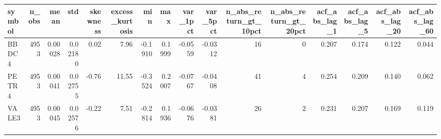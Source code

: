 \begin{tabular}{lrrrrrrrrrrrrrrr}
\toprule
symbol & n_obs & mean & std & skewness & excess_kurtosis & min & max & var_1pct & var_5pct & n_abs_return_gt_10pct & n_abs_return_gt_20pct & acf_abs_lag_1 & acf_abs_lag_5 & acf_abs_lag_20 & acf_abs_lag_60 \\
\midrule
BBDC4 & 4953 & 0.00028 & 0.02180 & 0.02 & 7.96 & -0.1910 & 0.1999 & -0.0559 & -0.0312 & 16 & 0 & 0.207 & 0.174 & 0.122 & 0.044 \\
PETR4 & 4953 & 0.00041 & 0.02755 & -0.76 & 11.55 & -0.3524 & 0.2007 & -0.0767 & -0.0408 & 41 & 4 & 0.254 & 0.209 & 0.140 & 0.062 \\
VALE3 & 4953 & 0.00045 & 0.02576 & -0.22 & 7.51 & -0.2814 & 0.1936 & -0.0676 & -0.0381 & 26 & 2 & 0.231 & 0.207 & 0.169 & 0.119 \\
\bottomrule
\end{tabular}
